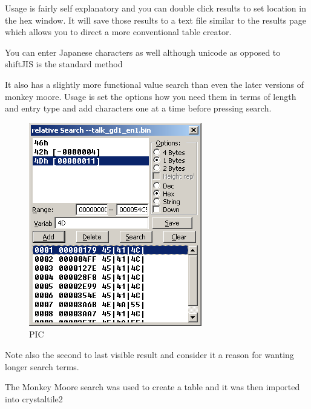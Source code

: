 \documentclass[
]{book}
\begin{document}
Usage is fairly self explanatory and you can double click results to set location in the hex window. It will save those results to a text file similar to the results page which allows you to direct a more conventional table creator.

You can enter Japanese characters as well although unicode as opposed to shiftJIS is the standard method

It also has a slightly more functional value search than even the later versions of monkey moore. Usage is set the options how you need them in terms of length and entry type and add characters one at a time before pressing search.

\begin{figure}
\centering
\includegraphics{images/85_home_fast6191_romhackingguide_unrenamed_file___ders_romhackingguiderelativesearchct2value1.png}
\caption{PIC}
\end{figure}

Note also the second to last visible result and consider it a reason for wanting longer search terms.

The Monkey Moore search was used to create a table and it was then imported into crystaltile2
\end{document}
